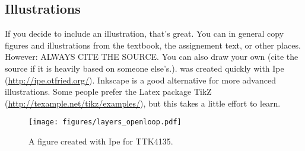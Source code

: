 \subsection{Illustrations}
If you decide to include an illustration, that's great. You can in general copy figures and illustrations from the textbook, the assignement text, or other places. However: ALWAYS CITE THE SOURCE\@. You can also draw your own (cite the source if it is heavily based on someone else's.).  was created quickly with Ipe (\url{http://ipe.otfried.org/}). Inkscape is a good alternative for more advanced illustrations. Some people prefer the Latex package TikZ (\url{http://texample.net/tikz/examples/}), but this takes a little effort to learn.

\begin{figure}[tp]
	\centering
	\texttt{[image: figures/layers\_openloop.pdf]}
	\caption{A figure created with Ipe for TTK4135.}
\label{fig:layers_openloop}
\end{figure}
